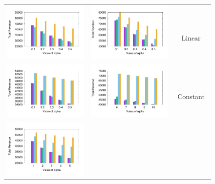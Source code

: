 \begin{figure}[t!]
\vspace{-4mm}
\begin{tabular}{ccc}
\vspace{-4mm}\includegraphics[width=.24\textwidth]{flix_alpha_totalRev_linear}&
	\hspace{-2mm}\includegraphics[width=.24\textwidth]{epi_alpha_totalRev_linear}&
\hspace{-4mm}\begin{sideways} $\;$ $\;\;$ $\;\;$ $\;\;$ $\;\;$ \textsf{\small Linear} \end{sideways} \\
\vspace{-4mm}\includegraphics[width=.24\textwidth]{flix_alpha_totalRev_uniform}&
	 \hspace{-2mm}\includegraphics[width=.24\textwidth]{epi_alpha_totalRev_uniform} &
\hspace{-4mm}\begin{sideways}  $\;$ $\;\;$ $\;\;$ $\;\;$ $\;\;$ \textsf{\small Constant} \end{sideways}\\
\vspace{-4mm}\includegraphics[width=.24\textwidth]{flix_alpha_totalRev_sublinear}&

\end{tabular}
\end{figure}
